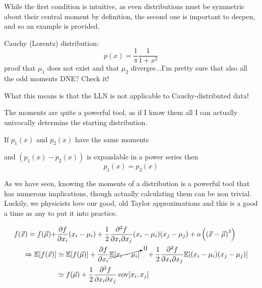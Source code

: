 While the first condition is intuitive, as even distributions must be symmetric about their central moment by definition, the second one is important to deepen, and so an example is provided.

\begin{example}
	Cauchy (Lorentz) distribution:
	\[
	p(x) = \frac{1}{\pi} \frac{1}{1+x^2}
	\]
	proof that $\mu_1$ does not exist and that $\mu_2$ diverges...I'm pretty sure that also all the odd moments DNE? Check it!
	
	What this means is that the LLN is not applicable to Cauchy-distributed data!
\end{example}

The moments are quite a powerful tool, as if I know them all I can actually univocally determine the starting distribution.
\begin{theorem}
	If $p_1(x)$ and $p_2(x)$ have the same moments 
	
	and $\left(p_1(x)-p_2(x)\right)$ is expandable in a power series then 
	\[
	p_1(x) = p_2(x)
	\]
\end{theorem}

As we have seen, knowing the moments of a distribution is a powerful tool that has numerous implications, though actually calculating them can be non trivial. Luckily, we physicists love our good, old Taylor approximations and this is a good a time as any to put it into practice.

\begin{align*}
	f(\vec{x}) = f(\vec{\mu}) + &\frac{\partial f}{\partial x_i}(x_i-\mu_i)+\frac{1}{2}\frac{\partial^2f}{\partial x_i \partial x_j}(x_i-\mu_i)(x_j-\mu_j)+o\left(\left(\vec{x}-\vec{\mu}\right)^3\right) \\
	\Rightarrow \mathbb{E}[f(\vec{x})] &\simeq \mathbb{E}[f(\vec{\mu})] + \frac{\partial f}{\partial x_i}\cancelto{0}{\mathbb{E}[x_i-\mu_i]} \quad + \frac{1}{2}\frac{\partial^2f}{\partial x_i \partial x_j}\mathbb{E}[(x_i-\mu_i)(x_j-\mu_j)] \\
	&\simeq f(\vec{\mu}) + \frac{1}{2}\frac{\partial^2f}{\partial x_i \partial x_j}\operatorname{cov}[x_i,x_j]
\end{align*}

